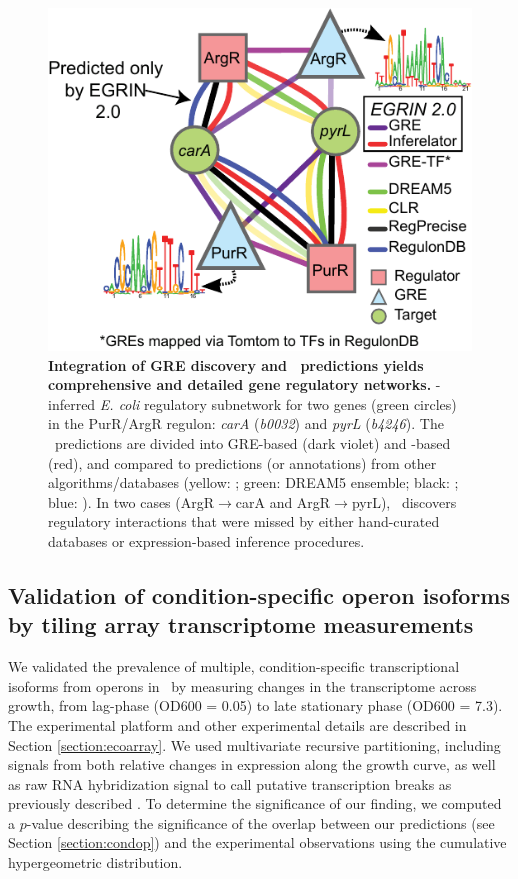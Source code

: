 \begin{figure}[hp]
\centering
\includegraphics[width=0.5\linewidth]{figures/argR_purR_networks.pdf}
\caption[Integration of GRE discovery and \nwinf\ predictions
  yields comprehensive and detailed gene regulatory
  networks]{\textbf{Integration of GRE discovery and \nwinf\ 
    predictions yields comprehensive and detailed gene regulatory
    networks.} \egrine-inferred \textit{E. coli} regulatory subnetwork
  for two genes (green circles) in the PurR/ArgR regulon:
  \textit{carA} (\textit{b0032}) and \textit{pyrL} (\textit{b4246}).
  The \egrine~predictions are divided into GRE-based (dark violet) and
  \nwinf-based (red), and compared to predictions (or
  annotations) from other algorithms/databases (yellow: ; green:
  DREAM5 ensemble; black: \tmsamp{RegPrecise}; blue: \tmsamp{RegulonDB}). In two cases
  (ArgR$\rightarrow$carA and ArgR$\rightarrow$pyrL), \egrine~discovers
  regulatory interactions that were missed by either hand-curated
  databases or expression-based inference procedures.}
\label{fig:argR_purR_networks}
\end{figure} 

\subsection{Validation of condition-specific operon isoforms by tiling array transcriptome measurements}

We validated the prevalence of multiple, condition-specific
transcriptional isoforms from operons in \eco\ by measuring changes in
the transcriptome across growth, from lag-phase (OD600 = 0.05) to late
stationary phase (OD600 = 7.3). The experimental platform and other
experimental details are described in Section
\ref{section:ecoarray}. We used multivariate recursive partitioning,
including signals from both relative changes in expression along the
growth curve, as well as raw RNA hybridization signal to call putative
transcription breaks as previously described \cite{Koide2009}. To
determine the significance of our finding, we computed a $p$-value
describing the significance of the overlap between our predictions
(see Section \ref{section:condop}) and the experimental observations
using the cumulative hypergeometric distribution.

